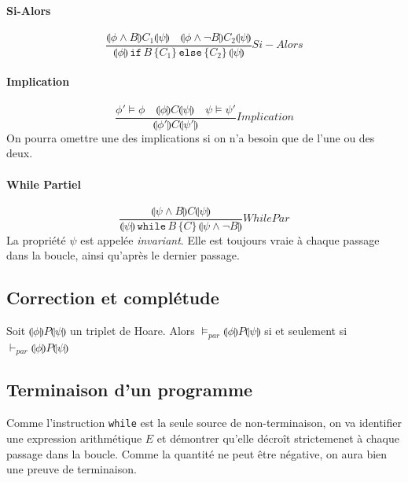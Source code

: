 \documentclass[a4paper]{article}
\begin{document}
  \paragraph{Si-Alors}
  $$  \frac{
        \llparenthesis \phi \land B \rrparenthesis C_1 \llparenthesis 
\psi \rrparenthesis \quad
        \llparenthesis \phi \land \lnot B \rrparenthesis C_2 
\llparenthesis \psi \rrparenthesis
      }
      {
        \llparenthesis \phi \rrparenthesis\, \texttt{if}\, B\, \{ C_1 
\}\, \texttt{else}\, \{ C_2\}\, \llparenthesis \psi \rrparenthesis
      } Si-Alors
  $$ 

  \paragraph{Implication}
  $$
    \frac{
      \phi' \vDash \phi \quad \llparenthesis\phi\rrparenthesis C 
\llparenthesis\psi\rrparenthesis \quad \psi \vDash \psi'
    }
    {
      \llparenthesis\phi'\rrparenthesis C 
\llparenthesis\psi'\rrparenthesis
    } Implication
  $$
  On pourra omettre une des implications si on n'a besoin que de l'une 
ou des deux.

  \paragraph{While Partiel}
  $$
    \frac{
      \llparenthesis\psi \land B \rrparenthesis C 
\llparenthesis\psi\rrparenthesis
    }
    {
      \llparenthesis\psi\rrparenthesis\, \texttt{while}\, B\, \{C\}\, 
\llparenthesis\psi \land \lnot B \rrparenthesis
    } WhilePar
  $$
  La propriété $\psi$ est appelée \textit{invariant}. Elle est toujours 
vraie à chaque
  passage dans la boucle, ainsi qu'après le dernier passage.

  \subsection{Correction et complétude}
  Soit $\llparenthesis\phi\rrparenthesis P 
\llparenthesis\psi\rrparenthesis$ un triplet
  de Hoare. Alors $\vDash_{par} \llparenthesis\phi\rrparenthesis P 
\llparenthesis\psi\rrparenthesis$
  si et seulement si $\vdash_{par} \llparenthesis\phi\rrparenthesis P 
\llparenthesis\psi\rrparenthesis$

  \subsection{Terminaison d'un programme}
  Comme l'instruction \texttt{while} est la seule source de 
non-terminaison,
  on va identifier une expression arithmétique $E$ et démontrer qu'elle
  décroît strictemenet à chaque passage dans la boucle. Comme la 
quantité ne peut
  être négative, on aura bien une preuve de terminaison. \\
\end{document}
